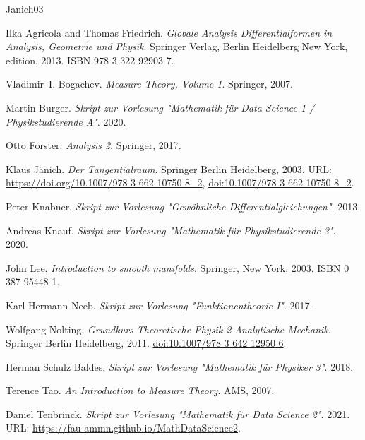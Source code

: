 \documentclass[letterpaper,10pt,german]{jupyterBook}
\begin{document}
\begin{sphinxthebibliography}{Janich03}
\par
Ilka Agricola and Thomas Friedrich. \emph{Globale Analysis   Differentialformen in Analysis, Geometrie und Physik}. Springer Verlag, Berlin Heidelberg New York, edition, 2013. ISBN 978 3 322 92903 7.
\par
Vladimir I. Bogachev. \emph{Measure Theory, Volume 1}. Springer, 2007.
\par
Martin Burger. \emph{Skript zur Vorlesung "Mathematik für Data Science 1 / Physikstudierende A"}. 2020.
\par
Otto Forster. \emph{Analysis 2}. Springer, 2017.
\par
Klaus Jänich. \emph{Der Tangentialraum}. Springer Berlin Heidelberg, 2003. URL: \url{https://doi.org/10.1007/978-3-662-10750-8\_2}, \href{https://doi.org/10.1007/978-3-662-10750-8\_2}{doi:10.1007/978 3 662 10750 8\_2}.
\par
Peter Knabner. \emph{Skript zur Vorlesung "Gewöhnliche Differentialgleichungen"}. 2013.
\par
Andreas Knauf. \emph{Skript zur Vorlesung "Mathematik für Physikstudierende 3"}. 2020.
\par
John Lee. \emph{Introduction to smooth manifolds}. Springer, New York, 2003. ISBN 0 387 95448 1.
\par
Karl Hermann Neeb. \emph{Skript zur Vorlesung "Funktionentheorie I"}. 2017.
\par
Wolfgang Nolting. \emph{Grundkurs Theoretische Physik 2   Analytische Mechanik}. Springer Berlin Heidelberg, 2011. \href{https://doi.org/10.1007/978-3-642-12950-6}{doi:10.1007/978 3 642 12950 6}.
\par
Herman Schulz Baldes. \emph{Skript zur Vorlesung "Mathematik für Physiker 3"}. 2018.
\par
Terence Tao. \emph{An Introduction to Measure Theory}. AMS, 2007.
\par
Daniel Tenbrinck. \emph{Skript zur Vorlesung "Mathematik für Data Science 2"}. 2021. URL: \url{https://fau-ammn.github.io/MathDataScience2}.
\end{sphinxthebibliography}






\renewcommand{\indexname}{Proof Index}


\renewcommand{\indexname}{Stichwortverzeichnis}
\end{document}
